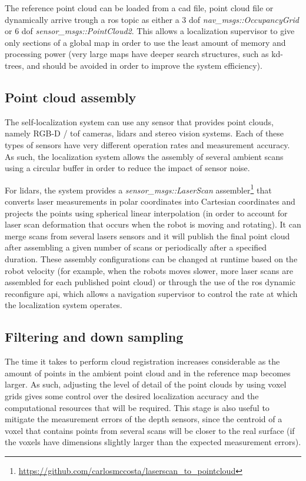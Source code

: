 The reference point cloud can be loaded from a \gls{cad} file, point cloud file or dynamically arrive trough a \gls{ros} topic as either a 3 \gls{dof} \emph{nav\_msgs::OccupancyGrid} or 6 \gls{dof} \emph{sensor\_msgs::PointCloud2}. This allows a localization supervisor to give only sections of a global map in order to use the least amount of memory and processing power (very large maps have deeper search structures, such as kd-trees, and should be avoided in order to improve the system efficiency).


\subsection{Point cloud assembly}

The self-localization system can use any sensor that provides point clouds, namely RGB-D / \gls{tof} cameras, \glspl{lidar} and stereo vision systems. Each of these types of sensors have very different operation rates and measurement accuracy. As such, the localization system allows the assembly of several ambient scans using a circular buffer in order to reduce the impact of sensor noise.

For \glspl{lidar}, the system provides a \emph{sensor\_msgs::LaserScan} assembler\footnote{\url{https://github.com/carlosmccosta/laserscan_to_pointcloud}} that converts laser measurements in polar coordinates into Cartesian coordinates and projects the points using spherical linear interpolation (in order to account for laser scan deformation that occurs when the robot is moving and rotating). It can merge scans from several lasers sensors and it will publish the final point cloud after assembling a given number of scans or periodically after a specified duration. These assembly configurations can be changed at runtime based on the robot velocity (for example, when the robots moves slower, more laser scans are assembled for each published point cloud) or through the use of the \gls{ros} dynamic reconfigure \gls{api}, which allows a navigation supervisor to control the rate at which the localization system operates.


\subsection{Filtering and down sampling}

The time it takes to perform cloud registration increases considerable as the amount of points in the ambient point cloud and in the reference map becomes larger. As such, adjusting the level of detail of the point clouds by using voxel grids gives some control over the desired localization accuracy and the computational resources that will be required. This stage is also useful to mitigate the measurement errors of the depth sensors, since the centroid of a voxel that contains points from several scans will be closer to the real surface (if the voxels have dimensions slightly larger than the expected measurement errors).

